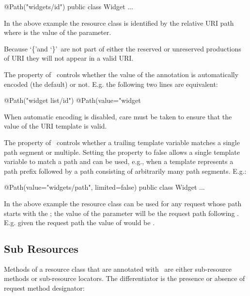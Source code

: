 \begin{listing}{1}
@Path("widgets/{id}")
public class Widget {
  ...
}\end{listing}

In the above example the  resource class is identified by the relative URI path  where  is the value of the  parameter.

\begin{nnnote}Because \lq\{\rq and \lq\}\rq\ are not part of either the reserved or unreserved productions of URI\cite{uri} they will not appear in a valid URI.\end{nnnote}

The  property of \Path\ controls whether the value of the annotation is automatically encoded (the default) or not. E.g. the following two lines are equivalent:

\begin{listing}{1}
@Path("widget list/{id}")
@Path(value="widget%
\end{listing}

When automatic encoding is disabled, care must be taken to ensure that the value of the URI template is valid.

The  property of \Path\ controls whether a trailing template variable matches a single path segment or multiple. Setting the property to false allows a single template variable to match a path and can be used, e.g., when a template represents a path prefix followed by a path consisting of arbitrarily many path segments. E.g.:

\begin{listing}{1}
@Path(value="widgets/{path}", limited=false)
public class Widget {
  ...
}\end{listing}

In the above example the  resource class can be used for any request whose path starts with the ; the value of the  parameter will be the request path following . E.g. given the request path  the value of  would be .

\subsection{Sub Resources}
\label{sub_resources}

Methods of a resource class that are annotated with \Path\ are either sub-resource methods or sub-resource locators. The differentiator is the presence or absence of request method designator:


